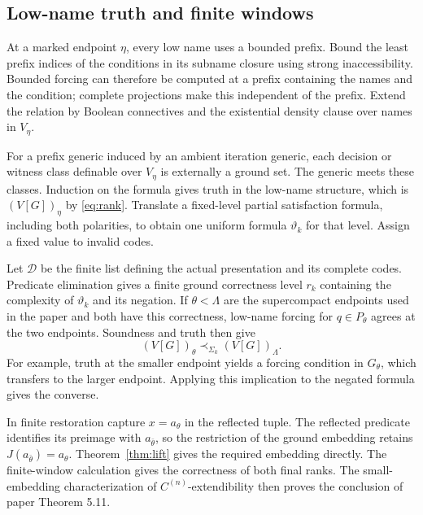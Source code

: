 \documentclass[11pt,a4paper]{amsart}
\begin{document}
\subsection{Low-name truth and finite windows}
At a marked endpoint $\eta$, every low name uses a bounded prefix. Bound the least prefix indices of the conditions in its subname closure using strong inaccessibility. Bounded forcing can therefore be computed at a prefix containing the names and the condition; complete projections make this independent of the prefix. Extend the relation by Boolean connectives and the existential density clause over names in $V_\eta$.

For a prefix generic induced by an ambient iteration generic, each decision or witness class definable over $V_\eta$ is externally a ground set. The generic meets these classes. Induction on the formula gives truth in the low-name structure, which is $(V[G])_\eta$ by \eqref{eq:rank}. Translate a fixed-level partial satisfaction formula, including both polarities, to obtain one uniform formula $\vartheta_k$ for that level. Assign a fixed value to invalid codes.

Let $\mathcal D$ be the finite list defining the actual presentation and its complete codes. Predicate elimination gives a finite ground correctness level $r_k$ containing the complexity of $\vartheta_k$ and its negation. If $\theta<\Lambda$ are the supercompact endpoints used in the paper and both have this correctness, low-name forcing for $q\in P_\theta$ agrees at the two endpoints. Soundness and truth then give
\[
(V[G])_\theta\prec_{\Sigma_k}(V[G])_\Lambda.
\]
For example, truth at the smaller endpoint yields a forcing condition in $G_\theta$, which transfers to the larger endpoint. Applying this implication to the negated formula gives the converse.

In finite restoration capture $x=a_\theta$ in the reflected tuple. The reflected predicate identifies its preimage with $a_{\bar\theta}$, so the restriction of the ground embedding retains $J(a_{\bar\theta})=a_\theta$. Theorem~\ref{thm:lift} gives the required embedding directly. The finite-window calculation gives the correctness of both final ranks. The small-embedding characterization of $C^{(n)}$-extendibility \cite[Corollary 2.7]{BagariaPoveda} then proves the conclusion of paper Theorem 5.11.
\end{document}
